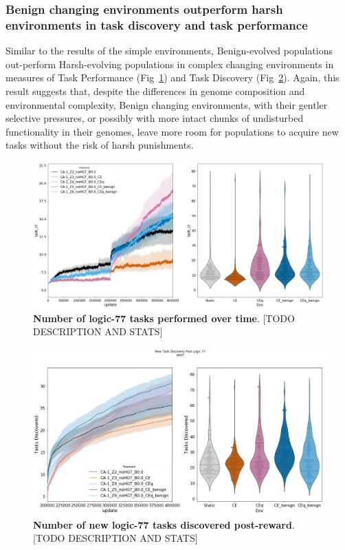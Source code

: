 \documentclass[PhD]{msu-thesis}
\begin{document}
\subsubsection{Benign changing environments outperform harsh environments in task discovery and task performance}
Similar to the results of the simple environments, Benign-evolved populations out-perform Harsh-evolving populations in complex changing environments in measures of Task Performance (Fig~\ref{fig:complex-task_performance}) and Task Discovery (Fig~\ref{fig:complex-task_discovery}). Again, this result suggests that, despite the differences in genome composition and environmental complexity, Benign changing environments, with their gentler selective pressures, or possibly with more intact chunks of undisturbed functionality in their genomes, leave more room for populations to acquire new tasks without the risk of harsh punishments. 

	\begin{figure}[!h]
	\includegraphics[trim={0 0 0 0}, clip, width=0.75\columnwidth]{figures/LTE/lte-complex-task_performance.png}
	\caption{\textbf{Number of logic-77 tasks performed over time}. [TODO DESCRIPTION AND STATS]%
	}
	\label{fig:complex-task_performance}
	\end{figure}

	\begin{figure}[!h]
	\includegraphics[trim={0 0 0 0}, clip, width=0.75\columnwidth]{figures/LTE/lte-complex-post_reward_task_discovery.png}
	\caption{\textbf{Number of new logic-77 tasks discovered post-reward}. [TODO DESCRIPTION AND STATS]%
	}
	\label{fig:complex-task_discovery}
	\end{figure}
\end{document}
